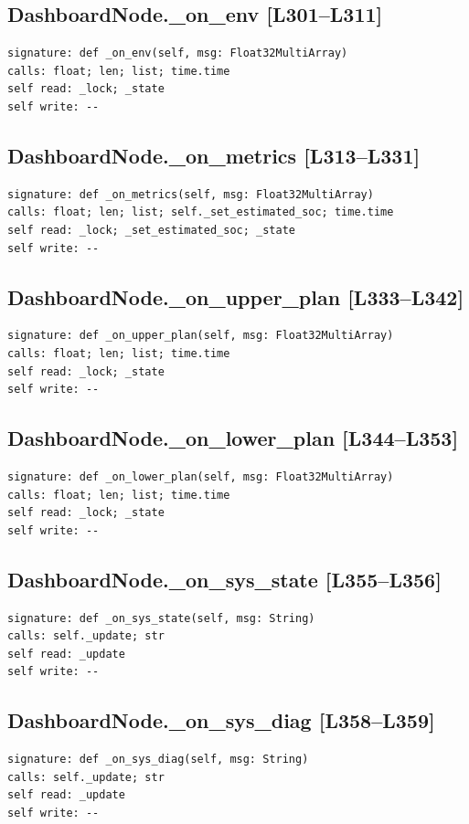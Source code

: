 \documentclass[a4paper,10pt,oneside]{book}
\begin{document}
\subsection*{DashboardNode.\_on\_env [L301--L311]}
\begin{lstlisting}[numbers=none]
signature: def _on_env(self, msg: Float32MultiArray)
calls: float; len; list; time.time
self read: _lock; _state
self write: --
\end{lstlisting}
\subsection*{DashboardNode.\_on\_metrics [L313--L331]}
\begin{lstlisting}[numbers=none]
signature: def _on_metrics(self, msg: Float32MultiArray)
calls: float; len; list; self._set_estimated_soc; time.time
self read: _lock; _set_estimated_soc; _state
self write: --
\end{lstlisting}
\subsection*{DashboardNode.\_on\_upper\_plan [L333--L342]}
\begin{lstlisting}[numbers=none]
signature: def _on_upper_plan(self, msg: Float32MultiArray)
calls: float; len; list; time.time
self read: _lock; _state
self write: --
\end{lstlisting}
\subsection*{DashboardNode.\_on\_lower\_plan [L344--L353]}
\begin{lstlisting}[numbers=none]
signature: def _on_lower_plan(self, msg: Float32MultiArray)
calls: float; len; list; time.time
self read: _lock; _state
self write: --
\end{lstlisting}
\subsection*{DashboardNode.\_on\_sys\_state [L355--L356]}
\begin{lstlisting}[numbers=none]
signature: def _on_sys_state(self, msg: String)
calls: self._update; str
self read: _update
self write: --
\end{lstlisting}
\subsection*{DashboardNode.\_on\_sys\_diag [L358--L359]}
\begin{lstlisting}[numbers=none]
signature: def _on_sys_diag(self, msg: String)
calls: self._update; str
self read: _update
self write: --
\end{lstlisting}
\end{document}
